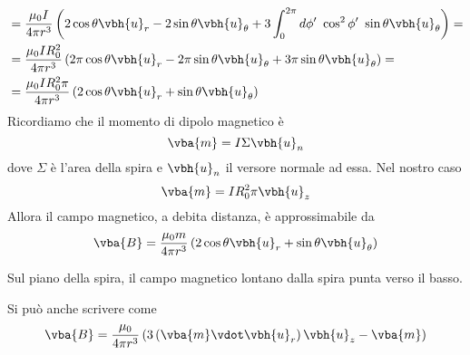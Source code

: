 \begin{itemize}
\begin{align*}
		&=\frac{\mu_0 I}{4\pi r^3}\left(2\cos\theta\vbh{u}_r-2\sin\theta\vbh{u}_{\theta}+3\int_{0}^{2\pi}d\phi'\ \cos^2\phi'\ \sin\theta\vbh{u}_\theta\right)=\\
		&=\frac{\mu_0 I R_0^2}{4\pi r^3}\left(2\pi\cos\theta\vbh{u}_r-2\pi \sin\theta\vbh{u}_{\theta}+3\pi \sin\theta\vbh{u}_\theta\right)=\\
		&=\frac{\mu_0 I R_0^2 \pi}{4 \pi r^3}\left(2\cos\theta\vbh{u}_r+ \sin\theta\vbh{u}_\theta\right)
	\end{align*}
	Ricordiamo che il momento di dipolo magnetico è
	\begin{equation*}
		\vba{m}=I\Sigma\vbh{u}_n
	\end{equation*}
	dove $\Sigma$ è l'area della spira e $\vbh{u}_n$ il versore normale ad essa. Nel nostro caso
	\begin{equation*}
		\vba{m}=IR_0^2\pi\vbh{u}_z
	\end{equation*}
	Allora il campo magnetico, a debita distanza, è approssimabile da
	\begin{equation}
		\vba{B}=\frac{\mu_0 m}{4 \pi r^3}\left(2\cos\theta\vbh{u}_r+ \sin\theta\vbh{u}_\theta\right)
	\end{equation}
	\begin{example}
		Sul piano della spira, il campo magnetico lontano dalla spira punta verso il basso.
	\end{example}
	Si può anche scrivere come
	\begin{equation}
		\vba{B}=\frac{\mu_0}{4 \pi r^3}\left(3\left(\vba{m}\vdot\vbh{u}_r\right)\vbh{u}_z-\vba{m}\right)
	\end{equation}
\end{itemize}
